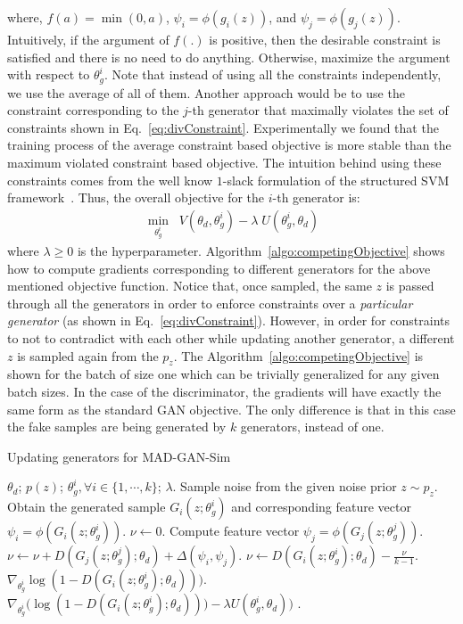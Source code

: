 where, $f(a) = \min(0, a)$, $\psi_i = \phi(g_i(z))$, and  $\psi_j = \phi(g_j(z))$. Intuitively, if the argument of $f(.)$ is positive, then the desirable constraint is satisfied and there is no need to do anything. Otherwise, maximize the argument with respect to $\theta_g^i$. Note that instead of using all the constraints independently, we use the average of all of them. Another approach would be to use the constraint corresponding to the $j$-th generator that maximally violates the set of constraints shown in Eq.~\ref{eq:divConstraint}. Experimentally we found that the training process of the average constraint based objective is more stable than the maximum violated constraint based objective. The intuition behind using these constraints comes from the well know $1$-slack formulation of the structured SVM framework~\cite{Joachims09_CuttingPlane,Tsochantaridis04SSVM}. Thus, the overall objective for the $i$-th generator is:
\begin{align*}
	\min_{\theta_g^i} \; \; V(\theta_d, \theta_g^i) - \lambda \; U(\theta_g^i, \theta_d)
\end{align*}
where $\lambda \geq 0$ is the hyperparameter. Algorithm~\ref{algo:competingObjective} shows how to compute gradients corresponding to different generators for the above mentioned objective function. Notice that, once sampled, the same $z$ is passed through all the generators in order to enforce constraints over a {\em particular generator} (as shown in Eq.~\ref{eq:divConstraint}). However, in order for constraints to not to contradict with each other while updating another generator, a different $z$ is sampled again from the $p_z$. The Algorithm~\ref{algo:competingObjective} is shown for the batch of size one which can be trivially generalized for any given batch sizes. In the case of the discriminator, the gradients will have exactly the same form as the standard GAN objective. The only difference is that in this case the fake samples are being generated by $k$ generators, instead of one.

\begin{algorithm}[tb]
	\caption{Updating generators for MAD-GAN-Sim}
	\label{algo:competingObjective}
	\begin{algorithmic}[1]
		\INPUT  $\theta_d$; $p(z)$; $\theta_g^i, \forall i \in \{1, \cdots, k \}$; $\lambda$.
		\STATE Sample noise from the given noise prior $z \sim p_z$.
		\STATE Obtain the generated sample $G_i(z; \theta_g^i)$ and corresponding feature vector $\psi_i = \phi(G_i(z; \theta_g^i))$.
		\STATE $\nu \leftarrow 0$.
		\STATE Compute feature vector $\psi_j = \phi(G_j(z; \theta_g^j))$.
		\STATE $\nu \leftarrow \nu +  D( G_j (z; \theta_g^j ) ; \theta_d) + \Delta(\psi_i, \psi_j)$.
		\ENDFOR
		\STATE $\nu \leftarrow D(G_i(z; \theta_g^i); \theta_d) - \frac{\nu}{k-1}$.
		\STATE $\nabla_{\theta_g^i} \log (1 - D(G_i(z; \theta_g^i); \theta_d)))$.
		\ELSE
		\STATE $\nabla_{\theta_g^i} \big( \log (1 - D(G_i(z; \theta_g^i); \theta_d))) - \lambda U(\theta_g^i, \theta_d) \big)$ .
		\ENDIF
		\ENDFOR
		\OUTPUT 
	\end{algorithmic}
\end{algorithm}

